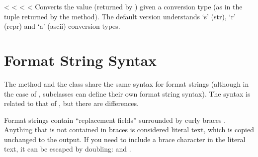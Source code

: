 \documentclass[letterpaper,10pt,english]{sphinxmanual}
\begin{document}
\begin{fulllineitems}
\vspace{5px}

\begin{fulllineitems}
\label{\detokenize{string:string.Formatter.convert_field}}
<%
\pysigstartsignatures
<%
<%
<%
Converts the value (returned by {\hyperref[\detokenize{string:string.Formatter.get_field}]{}}) given a conversion type
(as in the tuple returned by the {\hyperref[\detokenize{string:string.Formatter.parse}]{}} method).  The default
version understands ‘s’ (str), ‘r’ (repr) and ‘a’ (ascii) conversion
types.

\end{fulllineitems}


\end{fulllineitems}



\section{Format String Syntax}
\label{\detokenize{string:format-string-syntax}}\label{\detokenize{string:formatstrings}}
The  method and the {\hyperref[\detokenize{string:string.Formatter}]{}} class share the same
syntax for format strings (although in the case of {\hyperref[\detokenize{string:string.Formatter}]{}},
subclasses can define their own format string syntax).  The syntax is
related to that of , but
there are differences.

\ignorespaces
Format strings contain “replacement fields” surrounded by curly braces \sphinxcode{\sphinxupquote{\{\}}}.
Anything that is not contained in braces is considered literal text, which is
copied unchanged to the output.  If you need to include a brace character in the
literal text, it can be escaped by doubling: \sphinxcode{\sphinxupquote{\{\{}} and \sphinxcode{\sphinxupquote{\}\}}}.
\end{document}
